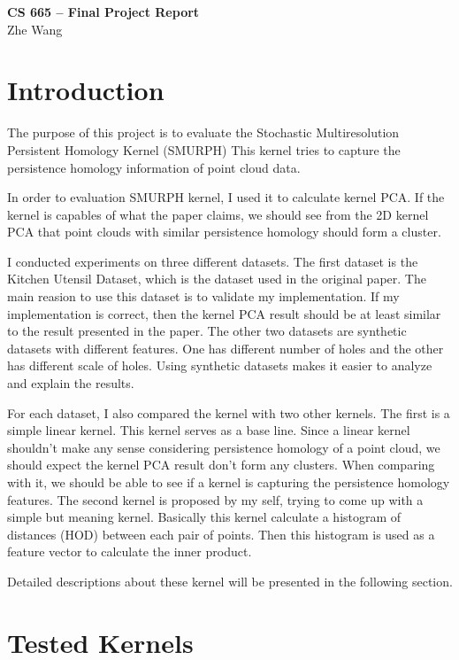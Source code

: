 \documentclass[10pt]{article}
\begin{document}
\begin{center}
    {\Large {\bf CS 665 -- Final Project Report}} \\
    Zhe Wang
    
\end{center}

\section{Introduction}

The purpose of this project is to evaluate the Stochastic Multiresolution Persistent Homology Kernel (SMURPH) \cite{zhu2016stochastic}
This kernel tries to capture the persistence homology information of point cloud data.

In order to evaluation SMURPH kernel, I used it to calculate kernel PCA.
If the kernel is capables of what the paper claims, we should see from the 2D kernel PCA that
point clouds with similar persistence homology should form a cluster.

I conducted experiments on three different datasets. 
The first dataset is the Kitchen Utensil Dataset, which is the dataset used in the original paper.
The main reasion to use this dataset is to validate my implementation. 
If my implementation is correct, then the kernel PCA result should be at least similar to the result presented in the paper.
The other two datasets are synthetic datasets with different features. One has different number of holes and the other has different scale of holes.
Using synthetic datasets makes it easier to analyze and explain the results.

For each dataset, I also compared the kernel with two other kernels.
The first is a simple linear kernel.
This kernel serves as a base line.
Since a linear kernel shouldn't make any sense considering persistence homology of a point cloud,
we should expect the kernel PCA result don't form any clusters.
When comparing with it, we should be able to see if a kernel is capturing the persistence homology features.
The second kernel is proposed by my self, trying to come up with a simple but meaning kernel.
Basically this kernel calculate a histogram of distances (HOD) between each pair of points.
Then this histogram is used as a feature vector to calculate the inner product.

Detailed descriptions about these kernel will be presented in the following section. 


\section{Tested Kernels}
\end{document}
